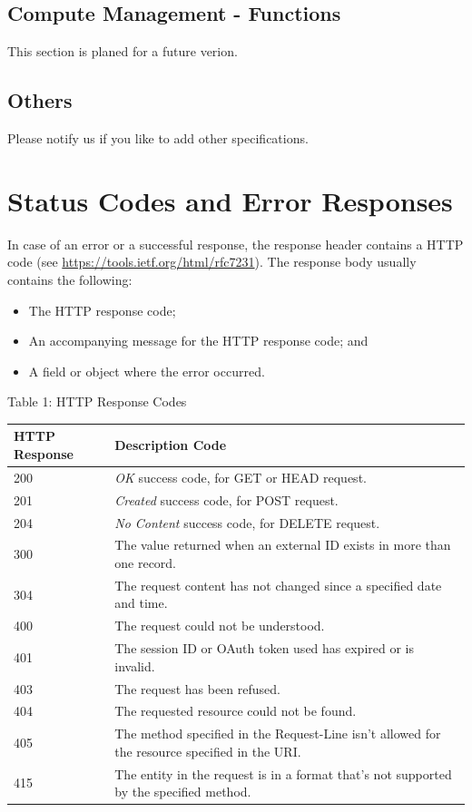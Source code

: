\documentclass[9pt,]{article}
\begin{document}
\hypertarget{compute-management---functions}{%
\subsection{Compute Management -
Functions}\label{compute-management---functions}}

This section is planed for a future verion.

\hypertarget{others}{%
\subsection{Others}\label{others}}

Please notify us if you like to add other specifications.

\hypertarget{status-codes-and-error-responses}{%
\section{Status Codes and Error
Responses}\label{status-codes-and-error-responses}}

In case of an error or a successful response, the response header
contains a HTTP code (see \url{https://tools.ietf.org/html/rfc7231}).
The response body usually contains the following:

\begin{itemize}
\item
  The HTTP response code;
\item
  An accompanying message for the HTTP response code; and
\item
  A field or object where the error occurred.
\end{itemize}

Table 1: HTTP Response Codes

\begin{longtable}[]{@{}ll@{}}
\toprule
HTTP Response & Description Code\tabularnewline
\midrule
\endhead
200 & \emph{OK} success code, for GET or HEAD request.\tabularnewline
201 & \emph{Created} success code, for POST request.\tabularnewline
204 & \emph{No Content} success code, for DELETE request.\tabularnewline
300 & The value returned when an external ID exists in more than one
record.\tabularnewline
304 & The request content has not changed since a specified date and
time.\tabularnewline
400 & The request could not be understood.\tabularnewline
401 & The session ID or OAuth token used has expired or is
invalid.\tabularnewline
403 & The request has been refused.\tabularnewline
404 & The requested resource could not be found.\tabularnewline
405 & The method specified in the Request-Line isn't allowed for the
resource specified in the URI.\tabularnewline
415 & The entity in the request is in a format that's not supported by
the specified method.\tabularnewline
\bottomrule
\end{longtable}
\end{document}
